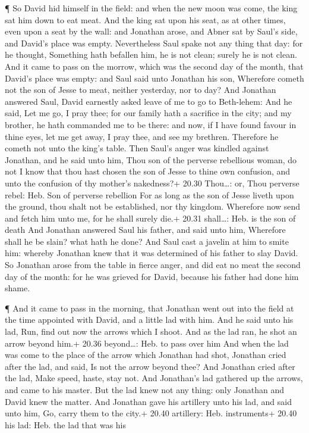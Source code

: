  ¶ So David hid himself in the field: and when the new moon
was come, the king sat him down to eat meat.  And the king
sat upon his seat, as at other times, even upon a seat by the wall: and
Jonathan arose, and Abner sat by Saul's side, and David's place was
empty.  Nevertheless Saul spake not any thing that day: for
he thought, Something hath befallen him, he is not clean; surely he is
not clean.  And it came to pass on the morrow, which was
the second day of the month, that David's place was empty: and Saul said
unto Jonathan his son, Wherefore cometh not the son of Jesse to meat,
neither yesterday, nor to day?  And Jonathan answered Saul,
David earnestly asked leave of me to go to Beth-lehem:  And
he said, Let me go, I pray thee; for our family hath a sacrifice in the
city; and my brother, he hath commanded me to be there: and now, if I
have found favour in thine eyes, let me get away, I pray thee, and see
my brethren. Therefore he cometh not unto the king's table.
 Then Saul's anger was kindled against Jonathan, and he
said unto him, Thou son of the perverse rebellious woman, do not I know
that thou hast chosen the son of Jesse to thine own confusion, and unto
the confusion of thy mother's nakedness?+ 20.30 Thou\ldots: or, Thou
perverse rebel: Heb. Son of perverse rebellion  For as long
as the son of Jesse liveth upon the ground, thou shalt not be
established, nor thy kingdom. Wherefore now send and fetch him unto me,
for he shall surely die.+ 20.31 shall\ldots: Heb. is the son of death
 And Jonathan answered Saul his father, and said unto him,
Wherefore shall he be slain? what hath he done?  And Saul
cast a javelin at him to smite him: whereby Jonathan knew that it was
determined of his father to slay David.  So Jonathan arose
from the table in fierce anger, and did eat no meat the second day of
the month: for he was grieved for David, because his father had done him
shame.

 ¶ And it came to pass in the morning, that Jonathan went
out into the field at the time appointed with David, and a little lad
with him.  And he said unto his lad, Run, find out now the
arrows which I shoot. And as the lad ran, he shot an arrow beyond him.+
20.36 beyond\ldots: Heb. to pass over him  And when the lad
was come to the place of the arrow which Jonathan had shot, Jonathan
cried after the lad, and said, Is not the arrow beyond thee?
 And Jonathan cried after the lad, Make speed, haste, stay
not. And Jonathan's lad gathered up the arrows, and came to his master.
 But the lad knew not any thing: only Jonathan and David
knew the matter.  And Jonathan gave his artillery unto his
lad, and said unto him, Go, carry them to the city.+ 20.40 artillery:
Heb. instruments+ 20.40 his lad: Heb. the lad that was his

